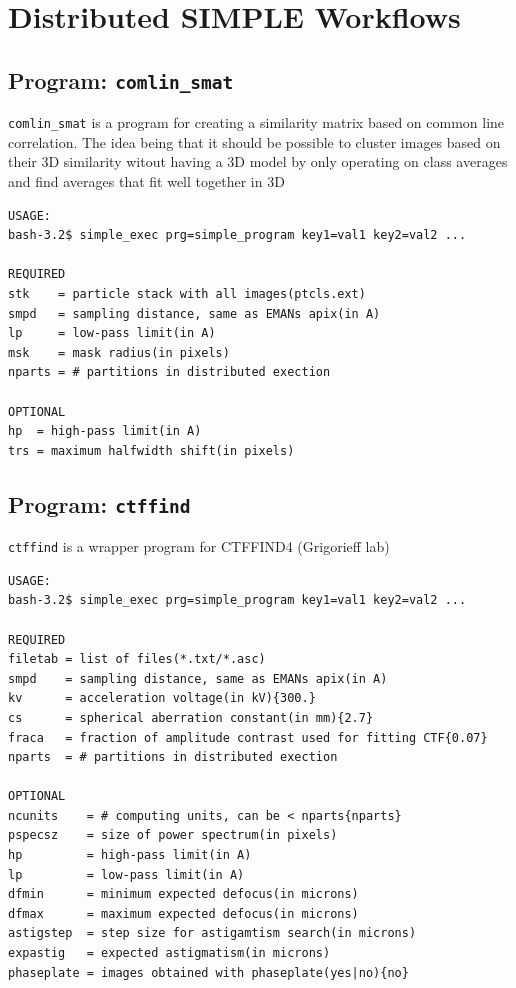 \documentclass[a4paper,11pt]{article}
\newcommand{\prgname}[1]{\textcolor{NavyBlue}{\texttt{#1}}}
\begin{document}
\section{Distributed SIMPLE Workflows}
\subsection{Program: \prgname{comlin\_smat}}
\label{comlin_smat}
\prgname{comlin\_smat} is a program for creating a similarity matrix based on common line correlation. The idea being that it should be possible to cluster images based on their 3D similarity witout having a 3D model by only operating on class averages and find averages that fit well together in 3D

\begin{verbatim}
USAGE:
bash-3.2$ simple_exec prg=simple_program key1=val1 key2=val2 ...

REQUIRED
stk    = particle stack with all images(ptcls.ext)
smpd   = sampling distance, same as EMANs apix(in A)
lp     = low-pass limit(in A)
msk    = mask radius(in pixels)
nparts = # partitions in distributed exection

OPTIONAL
hp  = high-pass limit(in A)
trs = maximum halfwidth shift(in pixels)
\end{verbatim}

\subsection{Program: \prgname{ctffind}}
\label{ctffind}
\prgname{ctffind} is a wrapper program for CTFFIND4 (Grigorieff lab)

\begin{verbatim}
USAGE:
bash-3.2$ simple_exec prg=simple_program key1=val1 key2=val2 ...

REQUIRED
filetab = list of files(*.txt/*.asc)
smpd    = sampling distance, same as EMANs apix(in A)
kv      = acceleration voltage(in kV){300.}
cs      = spherical aberration constant(in mm){2.7}
fraca   = fraction of amplitude contrast used for fitting CTF{0.07}
nparts  = # partitions in distributed exection

OPTIONAL
ncunits    = # computing units, can be < nparts{nparts}
pspecsz    = size of power spectrum(in pixels)
hp         = high-pass limit(in A)
lp         = low-pass limit(in A)
dfmin      = minimum expected defocus(in microns)
dfmax      = maximum expected defocus(in microns)
astigstep  = step size for astigamtism search(in microns)
expastig   = expected astigmatism(in microns)
phaseplate = images obtained with phaseplate(yes|no){no}
\end{verbatim}
\end{document}

